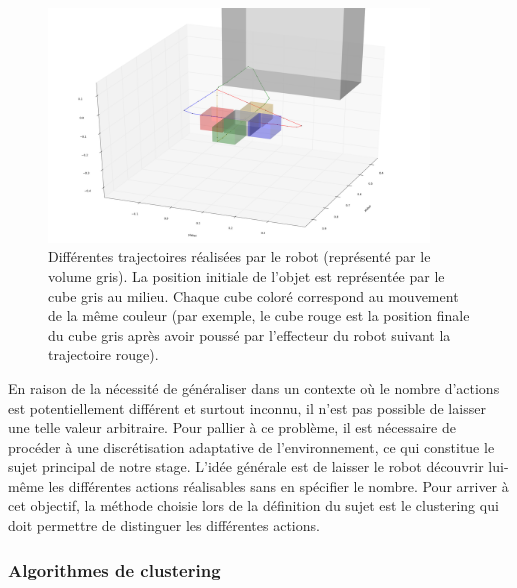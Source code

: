 \documentclass[draft]{llncs}
\begin{document}
\begin{figure}
  \begin{center}
    \includegraphics[width=0.9\textwidth]{figures/trajectories}
  \end{center}
  \caption{Différentes trajectoires réalisées par le robot (représenté par le volume gris). La position initiale de l'objet est représentée par le cube gris au milieu. Chaque cube coloré correspond au mouvement de la même couleur (par exemple, le cube rouge est la position finale du cube gris après avoir poussé par l'effecteur du robot suivant la trajectoire rouge).}
  \label{fig:trajectories}
\end{figure}

En raison de la nécessité de généraliser dans un contexte où le nombre d'actions est potentiellement différent et surtout inconnu, il n'est pas possible de laisser une telle valeur arbitraire.
Pour pallier à ce problème, il est nécessaire de procéder à une discrétisation adaptative de l'environnement, ce qui constitue le sujet principal de notre stage.
L'idée générale est de laisser le robot découvrir lui-même les différentes actions réalisables sans en spécifier le nombre.
Pour arriver à cet objectif, la méthode choisie lors de la définition du sujet est le clustering qui doit permettre de distinguer les différentes actions.




\subsubsection{Algorithmes de clustering}
\end{document}
